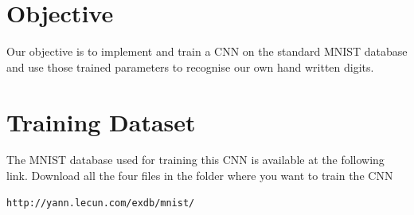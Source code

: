 \documentclass[journal,12pt,twocolumn]{IEEEtran}
\begin{document}
\section{Objective}
%
Our objective is to implement and train a CNN on the standard MNIST database and use those trained parameters to recognise our own hand written digits.
%
\section{Training Dataset}
The MNIST database used for training this CNN is available at the following link. Download all the four files in the folder where you want to train the CNN
\begin{lstlisting}
http://yann.lecun.com/exdb/mnist/
\end{lstlisting}
\end{document}
